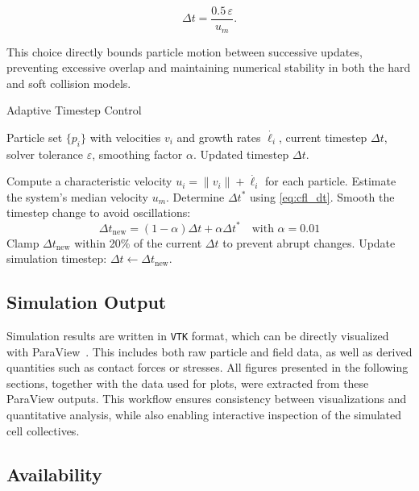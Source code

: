 \documentclass[conference]{IEEEtran}
\begin{document}
\begin{equation} \label{eq:cfl_dt}
    \Delta t = \frac{0.5 \, \varepsilon}{u_m}.
\end{equation}

This choice directly bounds particle motion between successive updates, preventing excessive overlap and maintaining numerical stability in both the hard and soft collision models.





\begin{algorithm}[H]
    \caption{Adaptive Timestep Control}
    \label{alg:adaptive_dt}
    \begin{algorithmic}[1]
        \Require Particle set $\{p_i\}$ with velocities $v_i$ and growth rates $\dot{\ell_i}$,
        current timestep $\Delta t$, solver tolerance $\varepsilon$, smoothing factor $\alpha$.
        \Ensure Updated timestep $\Delta t$.

        \State Compute a characteristic velocity $u_i = \|v_i\| + \dot{\ell_i}$ for each particle.
        \State Estimate the system’s median velocity $u_m$.
        \State Determine $\Delta t^*$ using \autoref{eq:cfl_dt}.
        \State Smooth the timestep change to avoid oscillations:
        \[
            \Delta t_{\text{new}} = (1 - \alpha)\Delta t + \alpha \Delta t^* \quad \text{with } \alpha = 0.01
        \]
        \State Clamp $\Delta t_{\text{new}}$ within 20\% of the current $\Delta t$ to prevent abrupt changes.
        \State Update simulation timestep: $\Delta t \gets \Delta t_{\text{new}}$.
    \end{algorithmic}
\end{algorithm}


\subsection{Simulation Output}

Simulation results are written in \texttt{VTK} format, which can be directly visualized with ParaView~\cite{ahrens2005paraview}. This includes both raw particle and field data, as well as derived quantities such as contact forces or stresses.
All figures presented in the following sections, together with the data used for plots, were extracted from these ParaView outputs. This workflow ensures consistency between visualizations and quantitative analysis, while also enabling interactive inspection of the simulated cell collectives.


\subsection{Availability}
\end{document}
